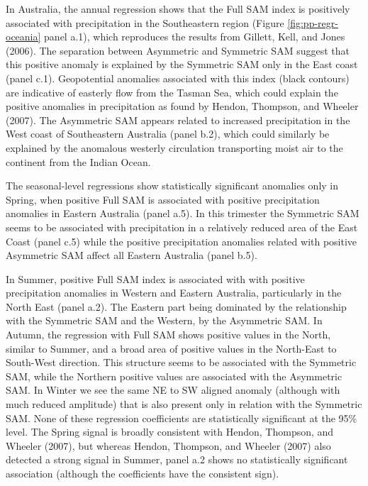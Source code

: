 \documentclass[smallextended]{svjour3}       %
\begin{document}
In Australia, the annual regression shows that the Full SAM index is positively associated with precipitation in the Southeastern region (Figure \ref{fig:pp-regr-oceania} panel a.1), which reproduces the results from Gillett, Kell, and Jones (2006). The separation between Asymmetric and Symmetric SAM suggest that this positive anomaly is explained by the Symmetric SAM only in the East coast (panel c.1). Geopotential anomalies associated with this index (black contours) are indicative of easterly flow from the Tasman Sea, which could explain the positive anomalies in precipitation as found by Hendon, Thompson, and Wheeler (2007). The Asymmetric SAM appears related to increased precipitation in the West coast of Southeastern Australia (panel b.2), which could similarly be explained by the anomalous westerly circulation transporting moist air to the continent from the Indian Ocean.

The seasonal-level regressions show statistically significant anomalies only in Spring, when positive Full SAM is associated with positive precipitation anomalies in Eastern Australia (panel a.5). In this trimester the Symmetric SAM seems to be associated with precipitation in a relatively reduced area of the East Coast (panel c.5) while the positive precipitation anomalies related with positive Asymmetric SAM affect all Eastern Australia (panel b.5).

In Summer, positive Full SAM index is associated with with positive precipitation anomalies in Western and Eastern Australia, particularly in the North East (panel a.2). The Eastern part being dominated by the relationship with the Symmetric SAM and the Western, by the Asymmetric SAM. In Autumn, the regression with Full SAM shows positive values in the North, similar to Summer, and a broad area of positive values in the North-East to South-West direction. This structure seems to be associated with the Symmetric SAM, while the Northern positive values are associated with the Asymmetric SAM. In Winter we see the same NE to SW aligned anomaly (although with much reduced amplitude) that is also present only in relation with the Symmetric SAM. None of these regression coefficients are statistically significant at the 95\% level. The Spring signal is broadly consistent with Hendon, Thompson, and Wheeler (2007), but whereas Hendon, Thompson, and Wheeler (2007) also detected a strong signal in Summer, panel a.2 shows no statistically significant association (although the coefficients have the consistent sign).
\end{document}
